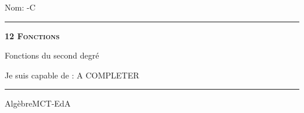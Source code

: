 \documentclass[11pt,a4paper]{article}
\begin{document}
\begin{titlepage}
    \setlength{\topskip}{0mm}
Nom: \hfill \the\year-C
\vspace{0.5cm}
\hrule

    \centering
    \vspace{0.1\textheight}
	{\bfseries\scshape\Huge 12 Fonctions\par}
    \vspace{1.5cm}

    {\huge Fonctions du second degré}
	\vspace{1.5cm}
    
    {\large Je suis capable de :}
    \vspace{1.5cm}
    A COMPLETER

\vfill
\hrule
\vspace{0.5cm}
Algèbre\hfill MCT-EdA

\end{titlepage}
\end{document}
